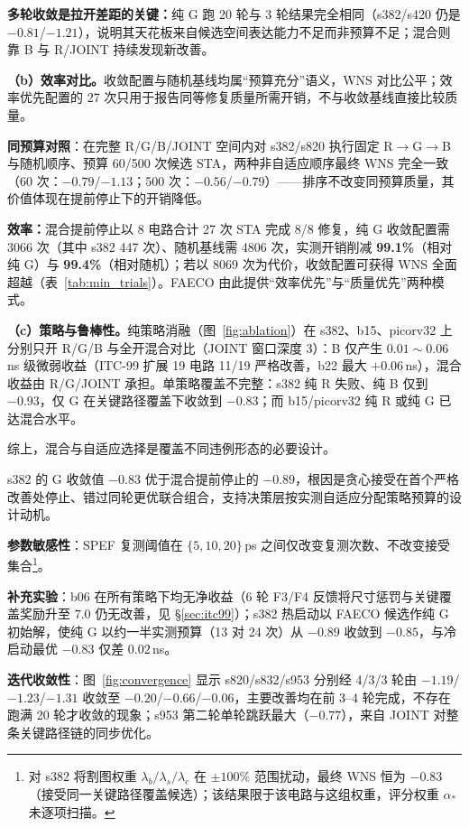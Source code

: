 \documentclass[journal]{IEEEtran}
\begin{document}
\textbf{多轮收敛是拉开差距的关键：}纯 G 跑 20 轮与 3 轮结果完全相同（s382/s420 仍是 $-0.81$/$-1.21$），说明其天花板来自候选空间表达能力不足而非预算不足；混合则靠 B 与 R/JOINT 持续发现新改善。

\textbf{（b）效率对比。}收敛配置与随机基线均属“预算充分”语义，WNS 对比公平；效率优先配置的 27 次只用于报告同等修复质量所需开销，不与收敛基线直接比较质量。

\textbf{同预算对照}：在完整 R/G/B/JOINT 空间内对 s382/s820 执行固定 R$\rightarrow$G$\rightarrow$B 与随机顺序、预算 60/500 次候选 STA，两种非自适应顺序最终 WNS 完全一致（60 次：$-0.79$/$-1.13$；500 次：$-0.56$/$-0.79$）——排序不改变同预算质量，其价值体现在提前停止下的开销降低。

\textbf{效率：}混合提前停止以 8 电路合计 27 次 STA 完成 8/8 修复，纯 G 收敛配置需 3066 次（其中 s382 447 次）、随机基线需 4806 次，实测开销削减 \textbf{99.1\%}（相对纯 G）与 \textbf{99.4\%}（相对随机）；若以 8069 次为代价，收敛配置可获得 WNS 全面超越（表~\ref{tab:min_trials}）。FAECO 由此提供“效率优先”与“质量优先”两种模式。

\textbf{（c）策略与鲁棒性。}纯策略消融（图~\ref{fig:ablation}）在 s382、b15、picorv32 上分别只开 R/G/B 与全开混合对比（JOINT 窗口深度 3）：B 仅产生 $0.01\!\sim\!0.06\,$ns 级微弱收益（ITC-99 扩展 19 电路 11/19 严格改善，b22 最大 $+0.06\,$ns），混合收益由 R/G/JOINT 承担。单策略覆盖不完整：s382 纯 R 失败、纯 B 仅到 $-0.93$，仅 G 在关键路径覆盖下收敛到 $-0.83$；而 b15/picorv32 纯 R 或纯 G 已达混合水平。

综上，混合与自适应选择是覆盖不同违例形态的必要设计。

s382 的 G 收敛值 $-0.83$ 优于混合提前停止的 $-0.89$，根因是贪心接受在首个严格改善处停止、错过同轮更优联合组合，支持决策层按实测自适应分配策略预算的设计动机。

\textbf{参数敏感性}：SPEF 复测阈值在 $\{5,10,20\}\,$ps 之间仅改变复测次数、不改变接受集合\footnote{对 s382 将割图权重 $\lambda_b/\lambda_s/\lambda_c$ 在 $\pm 100\%$ 范围扰动，最终 WNS 恒为 $-0.83$（接受同一关键路径覆盖候选）；该结果限于该电路与这组权重，评分权重 $\alpha_*$ 未逐项扫描。}。

\textbf{补充实验}：b06 在所有策略下均无净收益（6 轮 F3/F4 反馈将尺寸惩罚与关键覆盖奖励升至 $7.0$ 仍无改善，见 \S\ref{sec:itc99}）；s382 热启动以 FAECO 候选作纯 G 初始解，使纯 G 以约一半实测预算（13 对 24 次）从 $-0.89$ 收敛到 $-0.85$，与冷启动最优 $-0.83$ 仅差 $0.02\,$ns。

\textbf{迭代收敛性}：图~\ref{fig:convergence} 显示 s820/s832/s953 分别经 4/3/3 轮由 $-1.19$/$-1.23$/$-1.31$ 收敛至 $-0.20$/$-0.66$/$-0.06$，主要改善均在前 3--4 轮完成，不存在跑满 20 轮才收敛的现象；s953 第二轮单轮跳跃最大（$-0.77$），来自 JOINT 对整条关键路径链的同步优化。
\end{document}
